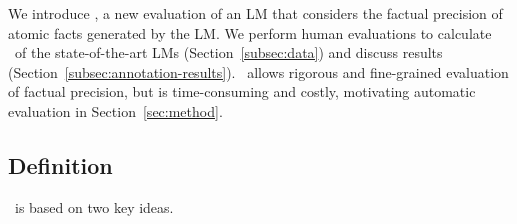 
We introduce \ours, a new evaluation of an LM that considers the factual precision of atomic facts generated by the LM.
We perform human evaluations to calculate \ourScores\ of the state-of-the-art LMs (Section~\ref{subsec:data}) and discuss results (Section~\ref{subsec:annotation-results}).
%
\ours\ allows rigorous and fine-grained evaluation of factual precision, but is time-consuming and costly, motivating automatic evaluation in Section~\ref{sec:method}.


\subsection{Definition}
\label{subsec:data-overview}

\ours\ is based on two key ideas.

